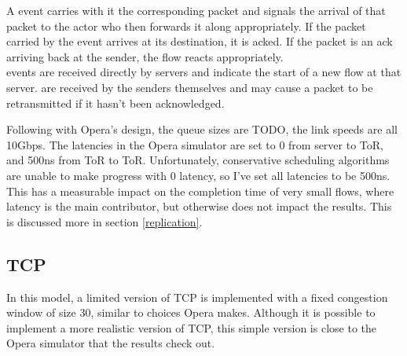 A  event carries with it the corresponding packet and signals the arrival of that packet to the actor who then forwards it along appropriately.
If the packet carried by the event arrives at its destination, it is acked.
If the packet is an ack arriving back at the sender, the flow reacts appropriately.\\

 events are received directly by servers and indicate the start of a new flow at that server.
 are received by the senders themselves and may cause a packet to be retransmitted if it hasn't been acknowledged.

Following with Opera's design, the queue sizes are TODO, the link speeds are all 10Gbps.
The latencies in the Opera simulator are set to 0 from server to ToR, and 500ns from ToR to ToR.
Unfortunately, conservative scheduling algorithms are unable to make progress with 0 latency, so I've set all latencies to be 500ns.
This has a measurable impact on the completion time of very small flows, where latency is the main contributor, but otherwise does not impact the results.
This is discussed more in section \ref{replication}.


\subsection{TCP} \label{model-tcp}

In this model, a limited version of TCP is implemented with a fixed congestion window of size 30, similar to choices Opera makes.
Although it is possible to implement a more realistic version of TCP, this simple version is close to the Opera simulator that the results check out.
